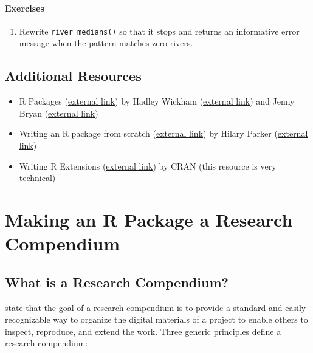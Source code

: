 \documentclass[
]{book}
\providecommand{\tightlist}{%
  \setlength{\itemsep}{0pt}\setlength{\parskip}{0pt}}
\begin{document}
\hypertarget{ex-set6}{%
\subsubsection{Exercises}\label{ex-set6}}

\begin{enumerate}
\def\labelenumi{\arabic{enumi}.}
\tightlist
\item
  Rewrite \texttt{river\_medians()} so that it stops and returns an informative error message when the pattern matches zero rivers.
\end{enumerate}

\hypertarget{add-resources}{%
\section{Additional Resources}\label{add-resources}}

\begin{itemize}
\tightlist
\item
  R Packages (\href{https://r-pkgs.org/index.html}{external link}) by Hadley Wickham (\href{http://hadley.nz/}{external link}) and Jenny Bryan (\href{https://jennybryan.org/}{external link}) \citep{wickham2015r}
\item
  Writing an R package from scratch (\href{https://hilaryparker.com/2014/04/29/writing-an-r-package-from-scratch/}{external link}) by Hilary Parker (\href{https://hilaryparker.com/}{external link})
\item
  Writing R Extensions (\href{https://cran.r-project.org/doc/manuals/r-release/R-exts.html}{external link}) by CRAN (this resource is very technical)
\end{itemize}

\hypertarget{r-package-rc}{%
\chapter{Making an R Package a Research Compendium}\label{r-package-rc}}

\hypertarget{what-is-a-rc}{%
\section{What is a Research Compendium?}\label{what-is-a-rc}}

\citet{marwick2018packaging} state that the goal of a research compendium is to provide a standard and easily recognizable way to organize the digital materials of a project to enable others to inspect, reproduce, and extend the work. Three generic principles define a research compendium:
\end{document}
